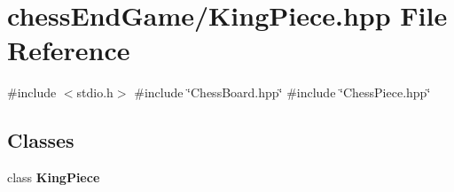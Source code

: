 \section{chess\+End\+Game/\+King\+Piece.hpp File Reference}
\label{_king_piece_8hpp}
{\ttfamily \#include $<$stdio.\+h$>$}\newline
{\ttfamily \#include \char`\"{}Chess\+Board.\+hpp\char`\"{}}\newline
{\ttfamily \#include \char`\"{}Chess\+Piece.\+hpp\char`\"{}}\newline
\subsection*{Classes}
\begin{DoxyCompactItemize}
\item 
class \textbf{ King\+Piece}
\end{DoxyCompactItemize}
